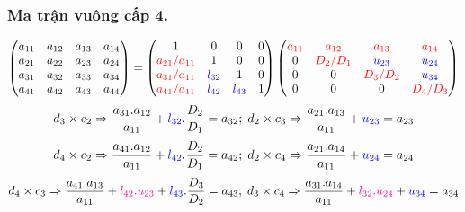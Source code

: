 \documentclass[12pt, a4paper]{report}
\begin{document}
\subsubsection{Ma trận vuông cấp 4.}
\[
    \begin{pmatrix}
        a_{11} & a_{12} & a_{13} & a_{14}\\
        a_{21} & a_{22} & a_{23} & a_{24}\\
        a_{31} & a_{32} & a_{33} & a_{34}\\
        a_{41} & a_{42} & a_{43} & a_{44}\\
    \end{pmatrix}  = \begin{pmatrix}
        1 & 0 & 0 & 0\\
        \textcolor{red}{a_{21}/a_{11}} & 1 & 0 & 0\\
        \textcolor{red}{a_{31}/a_{11}} & \textcolor{blue}{l_{32}} & 1 & 0\\
        \textcolor{red}{a_{41}/a_{11}} & \textcolor{blue}{l_{42}} & \textcolor{blue}{l_{43}} & 1
    \end{pmatrix} \begin{pmatrix}
        \textcolor{red}{a_{11}} & \textcolor{red}{a_{12}} & \textcolor{red}{a_{13}} & \textcolor{red}{a_{14}}\\
        0 & \textcolor{red}{D_2/D_1} & \textcolor{blue}{u_{23}} & \textcolor{blue}{u_{24}}\\
        0 & 0 & \textcolor{red}{D_3/D_2} & \textcolor{blue}{u_{34}} \\
        0 & 0 & 0 & \textcolor{red}{D_4/D_3}
    \end{pmatrix}
\]
\[
    d_3 \times c_2 \Rightarrow \frac{a_{31}.a_{12}}{a_{11}} +  \textcolor{blue}{l_{32}}.\dfrac{D_2}{D_1} = a_{32}; \thickspace d_2 \times c_3 \Rightarrow \frac{a_{21}.a_{13}}{a_{11}}+ \textcolor{blue}{u_{23}}=a_{23}
\]
\[
    d_4 \times c_2 \Rightarrow \frac{a_{41}.a_{12}}{a_{11}} +  \textcolor{blue}{l_{42}}.\dfrac{D_2}{D_1} = a_{42}; \thickspace d_2 \times c_4 \Rightarrow \frac{a_{21}.a_{14}}{a_{11}}+ \textcolor{blue}{u_{24}}=a_{24}
\]
\[
    d_4 \times c_3 \Rightarrow \frac{a_{41}.a_{13}}{a_{11}} + \textcolor{magenta}{l_{42}.u_{23}} + \textcolor{blue}{l_{43}}.\dfrac{D_3}{D_2} = a_{43}; \thickspace d_3 \times c_4 \Rightarrow \frac{a_{31}.a_{14}}{a_{11}}+ \textcolor{magenta}{l_{32}.u_{24}} + \textcolor{blue}{u_{34}}=a_{34}
\]
\newpage
\end{document}
